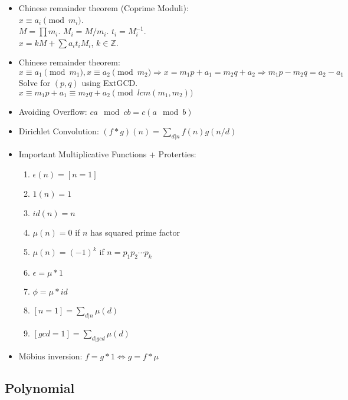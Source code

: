 \documentclass[a4paper,10pt,twocolumn,oneside]{article}
\begin{document}
{\begin{itemize}
    \item Chinese remainder theorem (Coprime Moduli):\\ $x \equiv a_i \pmod{m_i}$.\\
        $M=\prod m_i$. $M_i=M/m_i$. $t_i=M_i^{-1}$.\\
        $x = kM + \sum a_i t_i M_i$, $k \in \mathbb{Z}$.
        
    \item Chinese remainder theorem:\\
    $x \equiv a_1 \pmod{m_1}, x \equiv a_2 \pmod{m_2} \Rightarrow x = m_1 p + a_1 = m_2 q + a_2 \Rightarrow m_1 p - m_2 q = a_2 - a_1$\\
    Solve for $(p, q)$ using ExtGCD.\\
    $x \equiv m_1 p + a_1 \equiv m_2 q + a_2 \pmod{lcm(m_1, m_2)}$
    
    \item Avoiding Overflow:
    $ca \mod cb = c(a \mod b)$
    
    \item Dirichlet Convolution: $(f * g)(n) = \sum_{d|n} f(n)g(n/d)$
    
    \item Important Multiplicative Functions + Proterties:
    \begin{enumerate}[nolistsep]
        \item $\epsilon(n) = [n = 1]$
        \item $1(n) = 1$
        \item $id(n) = n$
        \item $\mu(n) = 0$ if $n$ has squared prime factor
        \item $\mu(n) = (-1)^k$ if $n = p_1 p_2 \cdots p_k$
        \item $\epsilon = \mu * 1$
        \item $\phi = \mu * id$
        \item $[n=1] = \sum_{d|n} \mu(d)$
        \item $[gcd=1] = \sum_{d|gcd} \mu(d)$
    \end{enumerate}
    
    \item Möbius inversion:
    $f = g * 1 \Leftrightarrow g = f * \mu$
\end{itemize}}

\subsection{Polynomial}

\end{document}
